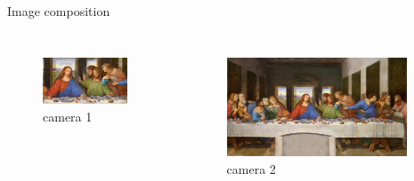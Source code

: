 \documentclass[hyperref={pdfpagelabels=false},aspectratio=169]{beamer}
\begin{document}
\begin{frame}{Image composition}
	\begin{columns}[T,onlytextwidth]
	\begin{figure} 
		\centering
		\def\svgwidth{1\textwidth}
		\includegraphics[width=0.9\textwidth]{closeup.jpg} \\ camera 1
	\end{figure}
	\begin{figure} 
		\centering
		\def\svgwidth{1\textwidth}
		\includegraphics[width=0.93\textwidth]{medium.jpg} \\ camera 2
	\end{figure}
\end{columns}
\end{frame}
\end{document}
